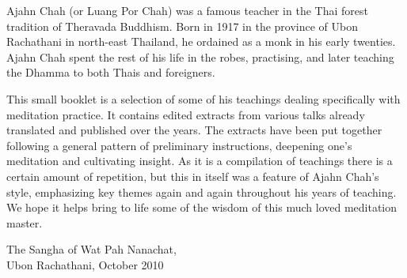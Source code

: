 
Ajahn Chah (or Luang Por Chah) was a famous teacher in the Thai forest tradition of Theravada Buddhism. Born in 1917 in the province of Ubon Rachathani in north-east Thailand, he ordained as a monk in his early twenties. Ajahn Chah spent the rest of his life in the robes, practising, and later teaching the Dhamma to both Thais and foreigners.

This small booklet is a selection of some of his teachings dealing specifically with meditation practice. It contains edited extracts from various talks already translated and published over the years. The extracts have been put together following a general pattern of preliminary instructions, deepening one's meditation and cultivating insight. As it is a compilation of teachings there is a certain amount of repetition, but this in itself was a feature of Ajahn Chah's style, emphasizing key themes again and again throughout his years of teaching. We hope it helps bring to life some of the wisdom of this much loved meditation master.
\bigskip

{\raggedleft\par The Sangha of Wat Pah Nanachat, \\
Ubon Rachathani, October 2010\par}

